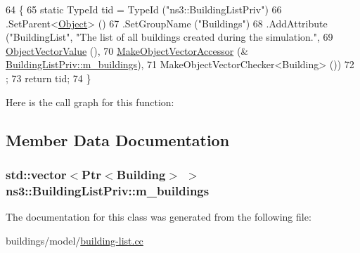 \begin{DoxyCode}
64 \{
65   \textcolor{keyword}{static} TypeId tid = TypeId (\textcolor{stringliteral}{"ns3::BuildingListPriv"})
66     .SetParent<\hyperlink{classns3_1_1Object_a40860402e64d8008fb42329df7097cdb}{Object}> ()
67     .SetGroupName (\textcolor{stringliteral}{"Buildings"})
68     .AddAttribute (\textcolor{stringliteral}{"BuildingList"}, \textcolor{stringliteral}{"The list of all buildings created during the simulation."},
69                    \hyperlink{namespacens3_a5de726d8bcea7a51fd68ce5167a66713}{ObjectVectorValue} (),
70                    \hyperlink{namespacens3_a6ad5b3621a5dc72b7030cbb07c73adf6}{MakeObjectVectorAccessor} (&
      \hyperlink{classns3_1_1BuildingListPriv_a02b34db9f6e8aafa9d21c19b8322a1bf}{BuildingListPriv::m\_buildings}),
71                    MakeObjectVectorChecker<Building> ())
72   ;
73   \textcolor{keywordflow}{return} tid;
74 \}
\end{DoxyCode}


Here is the call graph for this function\+:




\subsection{Member Data Documentation}
\subsubsection[{\texorpdfstring{m\+\_\+buildings}{m_buildings}}]{\setlength{\rightskip}{0pt plus 5cm}std\+::vector$<${\bf Ptr}$<${\bf Building}$>$ $>$ ns3\+::\+Building\+List\+Priv\+::m\+\_\+buildings\hspace{0.3cm}{\ttfamily [private]}}\hypertarget{classns3_1_1BuildingListPriv_a02b34db9f6e8aafa9d21c19b8322a1bf}{}\label{classns3_1_1BuildingListPriv_a02b34db9f6e8aafa9d21c19b8322a1bf}


The documentation for this class was generated from the following file\+:\begin{DoxyCompactItemize}
\item 
buildings/model/\hyperlink{building-list_8cc}{building-\/list.\+cc}\end{DoxyCompactItemize}
